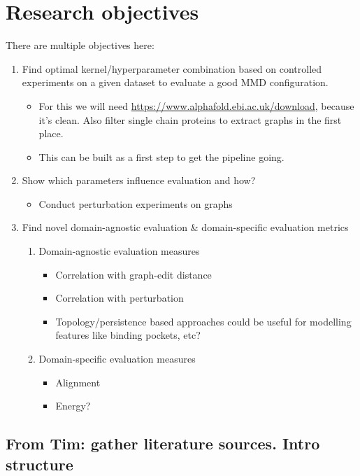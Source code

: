 \documentclass[12pt]{article}
\begin{document}
\section{Research objectives}
\label{sec:org58cac30}
There are multiple objectives here:
\begin{enumerate}
\item Find optimal kernel/hyperparameter combination based on controlled experiments on a given dataset to evaluate a good MMD configuration.
\begin{itemize}
\item For this we will need \url{https://www.alphafold.ebi.ac.uk/download}, because it's clean. Also filter single chain proteins to extract graphs in the first place.
\item This can be built as a first step to get the pipeline going.
\end{itemize}

\item Show which parameters influence evaluation and how?
\begin{itemize}
\item Conduct perturbation experiments on graphs
\end{itemize}

\item Find novel domain-agnostic evaluation \& domain-specific evaluation metrics
\begin{enumerate}
\item Domain-agnostic evaluation measures
\begin{itemize}
\item Correlation with graph-edit distance
\item Correlation with perturbation
\item Topology/persistence based approaches could be useful for modelling features like binding pockets, etc?
\end{itemize}

\item Domain-specific evaluation measures
\begin{itemize}
\item Alignment
\item Energy?
\end{itemize}
\end{enumerate}
\end{enumerate}
\subsection{From Tim: gather literature sources. Intro structure}
\label{sec:orgd5288e2}
\end{document}

